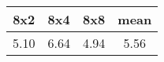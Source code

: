 \begin{tabular}{|c|c|c|c|}
\hline
\textbf{8x2}&\textbf{8x4}&\textbf{8x8}&\textbf{mean}\\\hline
5.10&6.64&4.94&5.56\\\hline
\end{tabular}
